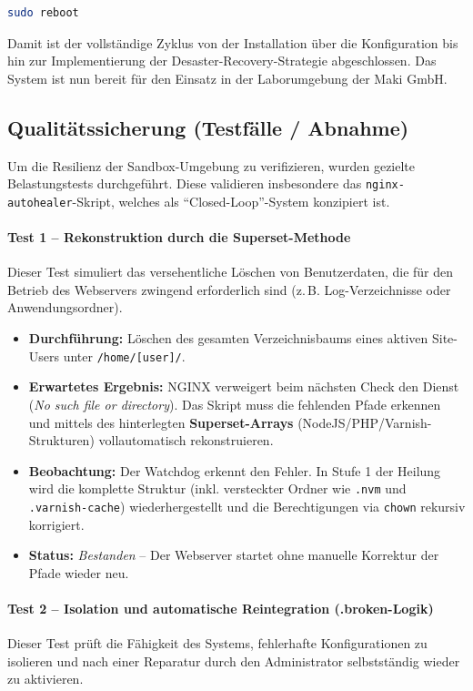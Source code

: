 \documentclass[11pt,
a4paper,
numbers=nonperiod,
footsepline,
oneside,
numbers=noenddot,
bibliography=totoc
]{scrartcl}
\begin{document}
\begin{lstlisting}[language=bash]
	sudo reboot
\end{lstlisting}
\bigskip
Damit ist der vollständige Zyklus von der Installation über die Konfiguration bis hin zur Implementierung der Desaster-Recovery-Strategie abgeschlossen. Das System ist nun bereit für den Einsatz in der Laborumgebung der Maki GmbH.
\newpage
\subsection{Qualitätssicherung (Testfälle / Abnahme)}

Um die Resilienz der Sandbox-Umgebung zu verifizieren, wurden gezielte Belastungstests durchgeführt. Diese validieren insbesondere das \texttt{nginx-autohealer}-Skript, welches als "`Closed-Loop"'-System konzipiert ist.

\paragraph{Test 1 – Rekonstruktion durch die Superset-Methode}
Dieser Test simuliert das versehentliche Löschen von Benutzerdaten, die für den Betrieb des Webservers zwingend erforderlich sind (z.\,B. Log-Verzeichnisse oder Anwendungsordner).

\begin{itemize}
	\item \textbf{Durchführung:} Löschen des gesamten Verzeichnisbaums eines aktiven Site-Users unter \newline\texttt{/home/[user]/}.
	\item \textbf{Erwartetes Ergebnis:} NGINX verweigert beim nächsten Check den Dienst (\textit{No such file or directory}). Das Skript muss die fehlenden Pfade erkennen und mittels des hinterlegten \textbf{Superset-Arrays} (NodeJS/PHP/Varnish-Strukturen) vollautomatisch rekonstruieren.
	\item \textbf{Beobachtung:} Der Watchdog erkennt den Fehler. In Stufe 1 der Heilung wird die komplette Struktur (inkl. versteckter Ordner wie \texttt{.nvm} und \texttt{.varnish-cache}) wiederhergestellt und die Berechtigungen via \texttt{chown} rekursiv korrigiert.
	\item \textbf{Status:} \textit{Bestanden} – Der Webserver startet ohne manuelle Korrektur der Pfade wieder neu.
\end{itemize}

\paragraph{Test 2 – Isolation und automatische Reintegration (.broken-Logik)}
Dieser Test prüft die Fähigkeit des Systems, fehlerhafte Konfigurationen zu isolieren und nach einer Reparatur durch den Administrator selbstständig wieder zu aktivieren.
\end{document}
